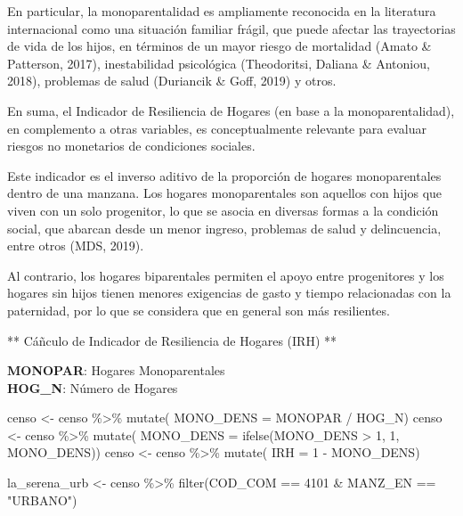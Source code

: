 \documentclass[
  letterpaper,
  DIV=11,
  numbers=noendperiod]{scrreprt}
\newenvironment{Shaded}{\begin{snugshade}}{\end{snugshade}}
\newcommand{\AttributeTok}[1]{\textcolor[rgb]{0.40,0.45,0.13}{#1}}
\newcommand{\DecValTok}[1]{\textcolor[rgb]{0.68,0.00,0.00}{#1}}
\newcommand{\FunctionTok}[1]{\textcolor[rgb]{0.28,0.35,0.67}{#1}}
\newcommand{\NormalTok}[1]{\textcolor[rgb]{0.00,0.23,0.31}{#1}}
\newcommand{\OtherTok}[1]{\textcolor[rgb]{0.00,0.23,0.31}{#1}}
\newcommand{\SpecialCharTok}[1]{\textcolor[rgb]{0.37,0.37,0.37}{#1}}
\newcommand{\StringTok}[1]{\textcolor[rgb]{0.13,0.47,0.30}{#1}}
\begin{document}
En particular, la monoparentalidad es ampliamente reconocida en la
literatura internacional como una situación familiar frágil, que puede
afectar las trayectorias de vida de los hijos, en términos de un mayor
riesgo de mortalidad (Amato \& Patterson, 2017), inestabilidad
psicológica (Theodoritsi, Daliana \& Antoniou, 2018), problemas de salud
(Duriancik \& Goff, 2019) y otros.

En suma, el Indicador de Resiliencia de Hogares (en base a la
monoparentalidad), en complemento a otras variables, es conceptualmente
relevante para evaluar riesgos no monetarios de condiciones sociales.

Este indicador es el inverso aditivo de la proporción de hogares
monoparentales dentro de una manzana. Los hogares monoparentales son
aquellos con hijos que viven con un solo progenitor, lo que se asocia en
diversas formas a la condición social, que abarcan desde un menor
ingreso, problemas de salud y delincuencia, entre otros (MDS, 2019).

Al contrario, los hogares biparentales permiten el apoyo entre
progenitores y los hogares sin hijos tienen menores exigencias de gasto
y tiempo relacionadas con la paternidad, por lo que se considera que en
general son más resilientes.

** Cáñculo de Indicador de Resiliencia de Hogares (IRH) **

\textbf{MONOPAR}: Hogares Monoparentales\\
\textbf{HOG\_N}: Número de Hogares

\begin{Shaded}
\begin{Highlighting}[]
\NormalTok{censo }\OtherTok{\textless{}{-}}\NormalTok{ censo }\SpecialCharTok{\%\textgreater{}\%} \FunctionTok{mutate}\NormalTok{( }\AttributeTok{MONO\_DENS =}\NormalTok{ MONOPAR }\SpecialCharTok{/}\NormalTok{ HOG\_N)}
\NormalTok{censo }\OtherTok{\textless{}{-}}\NormalTok{ censo }\SpecialCharTok{\%\textgreater{}\%} \FunctionTok{mutate}\NormalTok{( }\AttributeTok{MONO\_DENS =} \FunctionTok{ifelse}\NormalTok{(MONO\_DENS }\SpecialCharTok{\textgreater{}} \DecValTok{1}\NormalTok{, }\DecValTok{1}\NormalTok{, MONO\_DENS))  }
\NormalTok{censo }\OtherTok{\textless{}{-}}\NormalTok{ censo }\SpecialCharTok{\%\textgreater{}\%} \FunctionTok{mutate}\NormalTok{( }\AttributeTok{IRH =} \DecValTok{1} \SpecialCharTok{{-}}\NormalTok{ MONO\_DENS)}
\end{Highlighting}
\end{Shaded}

\begin{Shaded}
\begin{Highlighting}[]
\NormalTok{la\_serena\_urb }\OtherTok{\textless{}{-}}\NormalTok{ censo }\SpecialCharTok{\%\textgreater{}\%} \FunctionTok{filter}\NormalTok{(COD\_COM }\SpecialCharTok{==} \DecValTok{4101} \SpecialCharTok{\&}\NormalTok{ MANZ\_EN }\SpecialCharTok{==} \StringTok{"URBANO"}\NormalTok{)}
\end{Highlighting}
\end{Shaded}
\end{document}
